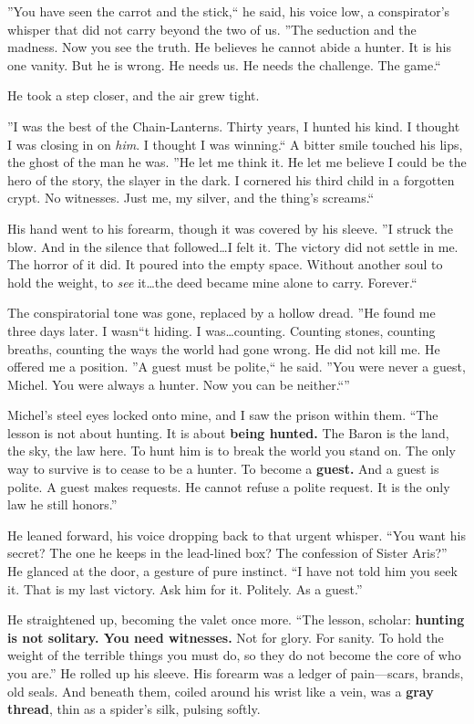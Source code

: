 \documentclass[11pt]{article}
\begin{document}
''You have seen the carrot and the stick,`` he said, his voice low, a conspirator's whisper that did not carry beyond the two of us. ''The seduction and the madness. Now you see the truth. He believes he cannot abide a hunter. It is his one vanity. But he is wrong. He needs us. He needs the challenge. The game.``

He took a step closer, and the air grew tight.

''I was the best of the Chain-Lanterns. Thirty years, I hunted his kind. I thought I was closing in on \textit{him}. I thought I was winning.`` A bitter smile touched his lips, the ghost of the man he was. ''He let me think it. He let me believe I could be the hero of the story, the slayer in the dark. I cornered his third child in a forgotten crypt. No witnesses. Just me, my silver, and the thing's screams.``

His hand went to his forearm, though it was covered by his sleeve. ''I struck the blow. And in the silence that followed\dots I felt it. The victory did not settle in me. The horror of it did. It poured into the empty space. Without another soul to hold the weight, to \textit{see} it\dots the deed became mine alone to carry. Forever.``

The conspiratorial tone was gone, replaced by a hollow dread. ''He found me three days later. I wasn``t hiding. I was\dots counting. Counting stones, counting breaths, counting the ways the world had gone wrong. He did not kill me. He offered me a position. ''A guest must be polite,`` he said. ''You were never a guest, Michel. You were always a hunter. Now you can be neither.``''

Michel's steel eyes locked onto mine, and I saw the prison within them. ``The lesson is not about hunting. It is about \textbf{being hunted.} The Baron is the land, the sky, the law here. To hunt him is to break the world you stand on. The only way to survive is to cease to be a hunter. To become a \textbf{guest.} And a guest is polite. A guest makes requests. He cannot refuse a polite request. It is the only law he still honors.''

He leaned forward, his voice dropping back to that urgent whisper. ``You want his secret? The one he keeps in the lead-lined box? The confession of Sister Aris?'' He glanced at the door, a gesture of pure instinct. ``I have not told him you seek it. That is my last victory. Ask him for it. Politely. As a guest.''

He straightened up, becoming the valet once more. ``The lesson, scholar: \textbf{hunting is not solitary. You need witnesses.} Not for glory. For sanity. To hold the weight of the terrible things you must do, so they do not become the core of who you are.'' He rolled up his sleeve. His forearm was a ledger of pain---scars, brands, old seals. And beneath them, coiled around his wrist like a vein, was a \textbf{gray thread}, thin as a spider's silk, pulsing softly.
\end{document}
